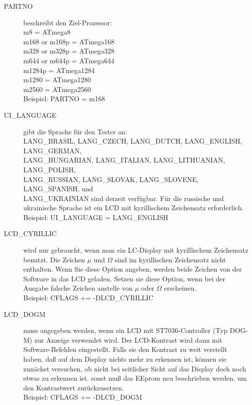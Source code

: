 \begin{description}
  \item[PARTNO] beschreibt den Ziel-Prozessor:\\
         m8 = ATmega8\\
         m168 or m168p = ATmega168\\
         m328 or m328p = ATmega328\\
         m644 or m644p = ATmega644\\
         m1284p        = ATmega1284\\
         m1280         = ATmega1280\\
         m2560         = ATmega2560\\
    Beispiel: PARTNO = m168

  \item[UI\_LANGUAGE] gibt die Sprache für den Tester an:\\
    LANG\_BRASIL, LANG\_CZECH, LANG\_DUTCH, LANG\_ENGLISH, LANG\_GERMAN, \\
    LANG\_HUNGARIAN, LANG\_ITALIAN, LANG\_LITHUANIAN, LANG\_POLISH, \\
    LANG\_RUSSIAN, LANG\_SLOVAK, LANG\_SLOVENE, LANG\_SPANISH, und \\
    LANG\_UKRAINIAN sind derzeit verfügbar.
 Für die russische und ukrainische Sprache ist ein LCD mit kyrillischem Zeichensatz erforderlich.\\
    Beispiel: UI\_LANGUAGE = LANG\_ENGLISH

  \item[LCD\_CYRILLIC] wird nur gebraucht, wenn man ein LC-Display mit kyrillischem Zeichensatz benutzt.
Die Zeichen \(\mu\) und \(\Omega\) sind im kyrillischen Zeichensatz nicht enthalten.
Wenn Sie diese Option angeben, werden beide Zeichen von der Software in das LCD geladen.
Setzen sie diese Option, wenn bei der Ausgabe falsche Zeichen anstelle von \(\mu\) oder \(\Omega\) erscheinen.\\
Beispiel: CFLAGS += -DLCD\_CYRILLIC

  \item[LCD\_DOGM] muss angegeben werden, wenn ein LCD mit ST7036-Controller (Typ DOG-M) zur Anzeige verwendet wird.
Der LCD-Kontrast wird dann mit Software-Befehlen eingestellt.
Falls sie den Kontrast zu weit verstellt haben, daß auf dem Display nichts mehr zu erkennen ist,
können sie zunächst versuchen, ob nicht bei seitlicher Sicht auf das Display doch noch etwas zu erkennen ist.
sonst muß das EEprom neu beschrieben werden, um den Kontrastwert zurückzusetzen.\\
Beispiel: CFLAGS += -DLCD\_DOGM


\end{description}
